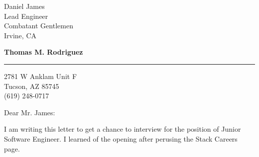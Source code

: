 \documentclass{letter} %
\begin{document}
\signature{Thomas M. Rodriguez}           %
\longindentation=0pt                       %
\let\raggedleft\raggedright                %
 
 
\begin{letter}{Daniel James \\
Lead Engineer \\
Combatant Gentlemen \\
Irvine, CA}

\begin{center}
{\large\bf Thomas M. Rodriguez}
\end{center}
\medskip\hrule height 1pt
\begin{center}
{2781 W Anklam Unit F \\ Tucson, AZ 85745 \\ (619) 248-0717}
\end{center} \vfill %
 
 
\opening{Dear Mr. James:} 
 

\noindent I am writing this letter to get a chance to interview for the position of Junior Software Engineer.  I learned of the opening after perusing the Stack Careers page.
 


\end{letter}
\end{document}
